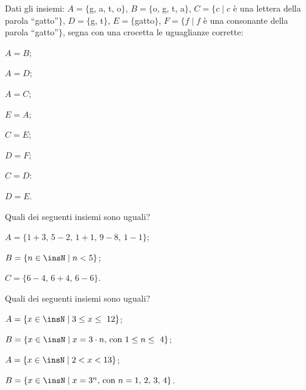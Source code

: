 \begin{esercizio}[\Ast]
\label{ese:5.38}
Dati gli insiemi:
$A=\{$g, a, t, o$\}$, $B=\{$o, g, t, a$\}$, $C=\{c\mid c$ è una lettera della parola ``gatto''$\}$,
$D=\{$g, t$\}$, $E=\{$gatto$\}$, $F=\{f\mid f$ è una consonante della parola ``gatto''$\}$,
segna con una crocetta le uguaglianze corrette:
\begin{multicols}{4}
\begin{enumeratea}
 \item $A = B$;
 \item $A = D$;
 \item $A = C$;
 \item $E = A$;
 \item $C = E$;
 \item $D = F$;
 \item $C = D$:
 \item $D = E$.
\end{enumeratea}
\end{multicols}
\end{esercizio}

\begin{esercizio}[\Ast]
\label{ese:5.39}
Quali dei seguenti insiemi sono uguali?
 \begin{enumeratea}
 \item $A=\{1+3\text{, }5-2\text{, }1+1\text{, }9-8\text{, }1-1\}$;
\item $B=\{n\in\insN\mid n<5\}$;
\item $C=\{6-4\text{, }6+4\text{, }6-6\}$.
 \end{enumeratea}
\end{esercizio}

\begin{esercizio}[\Ast]
\label{ese:5.40}
Quali dei seguenti insiemi sono uguali?
\begin{multicols}{2}
\begin{enumeratea}
\item $A=\{x\in\insN\mid 3\le x\le~12\}$;
\item $B=\{x\in\insN\mid x=3\cdot n\text{, con } 1\le n\le~4\}$;
\item $A=\{x\in\insN\mid 2<x<13\}$;
\item $B=\{x\in\insN\mid x=3^{n}\text{, con }n=\text{1, 2, 3, 4}\}$.
\end{enumeratea}
\end{multicols}
\end{esercizio}

